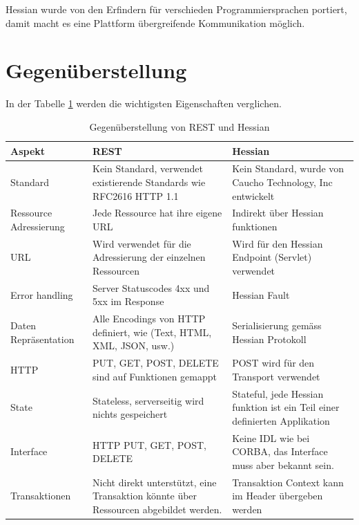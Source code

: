 \documentclass[abstracton, listof=totocnumbered,
bibliography=totocnumbered]{scrreprt}
\begin{document}
  Hessian wurde von den Erfindern für verschieden Programmiersprachen portiert,
  damit macht es eine Plattform übergreifende Kommunikation möglich.
  
  \enlargethispage{3cm}
  
  \section{Gegenüberstellung}
  
  In der Tabelle \ref{tab:gegenueberstellungRestHessian} werden die wichtigsten
  Eigenschaften verglichen.
  \newline
  
  \begin{table}[h]
    \begin{center}
      \begin{tabular}{p{2.4cm}p{6.1cm}p{6.1cm}}
        \toprule
        Aspekt & REST & Hessian \\
        \midrule
        \nohyphens{Standard} & Kein Standard, verwendet existierende Standards wie
        RFC2616 HTTP 1.1 & Kein Standard, wurde von Caucho Technology, Inc entwickelt\\
        \cmidrule{2-3}
        \nohyphens{Ressource Adressierung} & Jede Ressource hat ihre eigene \ac{URL}
        & Indirekt über Hessian funktionen\\
        \cmidrule{2-3}
        \nohyphens{URL} & Wird verwendet für die Adressierung der einzelnen
        Ressourcen & Wird für den Hessian Endpoint (Servlet) verwendet\\
        \cmidrule{2-3}
        \nohyphens{Error handling} & Server Statuscodes 4xx und 5xx im Response &
        Hessian Fault\\
        \cmidrule{2-3}
        \nohyphens{Daten Repräsentation} & Alle Encodings von \ac{HTTP} definiert,
        wie (Text, \ac{HTML}, \ac{XML}, \ac{JSON}, usw.) & Serialisierung
        gemäss Hessian Protokoll\\
        \cmidrule{2-3}
        \nohyphens{HTTP} & PUT, GET, POST, DELETE sind auf Funktionen gemappt & POST
        wird für den Transport verwendet\\
        \cmidrule{2-3}
        \nohyphens{State} & Stateless, serverseitig wird nichts gespeichert &
        Stateful, jede Hessian funktion ist ein Teil einer definierten Applikation\\
        \cmidrule{2-3}
        \nohyphens{Interface} & \ac{HTTP} PUT, GET, POST, DELETE & Keine \ac{IDL}
        wie bei \ac{CORBA}, das Interface muss aber bekannt sein.\\
        \cmidrule{2-3}
        \nohyphens{Transaktionen} & Nicht direkt unterstützt, eine Transaktion
        könnte über Ressourcen abgebildet werden. & Transaktion Context kann im Header übergeben
        werden\\
        \bottomrule
      \end{tabular}
      \caption{Gegenüberstellung von REST und Hessian}
      \label{tab:gegenueberstellungRestHessian}
    \end{center}
  \end{table}
  
\end{document}
